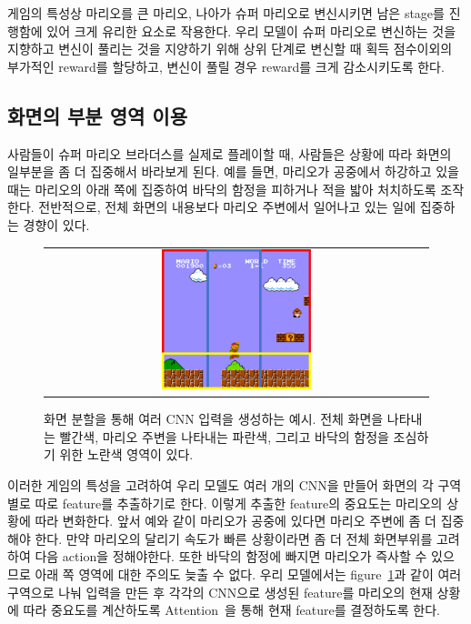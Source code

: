 게임의 특성상 마리오를 큰 마리오, 나아가 슈퍼 마리오로 변신시키면 남은 stage를 진행함에 있어 크게 유리한 요소로 작용한다.
우리 모델이 슈퍼 마리오로 변신하는 것을 지향하고 변신이 풀리는 것을 지양하기 위해 상위 단계로 변신할 때 획득 점수이외의 부가적인 reward를 할당하고, 변신이 풀릴 경우 reward를 크게 감소시키도록 한다.

\subsection{화면의 부분 영역 이용}
\label{sec:method:idea}
사람들이 슈퍼 마리오 브라더스를 실제로 플레이할 때, 사람들은 상황에 따라 화면의 일부분을 좀 더 집중해서 바라보게 된다.
예를 들면, 마리오가 공중에서 하강하고 있을 때는 마리오의 아래 쪽에 집중하여 바닥의 함정을 피하거나 적을 밟아 처치하도록 조작한다.
전반적으로, 전체 화면의 내용보다 마리오 주변에서 일어나고 있는 일에 집중하는 경향이 있다.

\begin{figure}[]
\begin{center}
\begin{tabular}{c}
     \includegraphics[width=0.4\textwidth]{FIG/split_screen.pdf} \\
\end{tabular}
\caption{
	화면 분할을 통해 여러 CNN 입력을 생성하는 예시. 전체 화면을 나타내는 빨간색, 마리오 주변을 나타내는 파란색, 그리고 바닥의 함정을 조심하기 위한 노란색 영역이 있다.
}
\label{fig:split_screen}
\end{center}
\end{figure}

이러한 게임의 특성을 고려하여 우리 모델도 여러 개의 CNN을 만들어 화면의 각 구역별로 따로 feature를 추출하기로 한다.
이렇게 추출한 feature의 중요도는 마리오의 상황에 따라 변화한다. 앞서 예와 같이 마리오가 공중에 있다면 마리오 주변에 좀 더 집중해야 한다.
만약 마리오의 달리기 속도가 빠른 상황이라면 좀 더 전체 화면부위를 고려하여 다음 action을 정해야한다.
또한 바닥의 함정에 빠지면 마리오가 즉사할 수 있으므로 아래 쪽 영역에 대한 주의도 늦출 수 없다.
우리 모델에서는 figure~\ref{fig:split_screen}과 같이 여러 구역으로 나눠 입력을 만든 후 각각의 CNN으로 생성된 feature를 마리오의 현재 상황에 따라 중요도를 계산하도록 Attention~\cite{Attention}을 통해 현재 feature를 결정하도록 한다.


